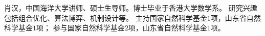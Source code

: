 %
%

\par{
肖汉，中国海洋大学讲师、硕士生导师。博士毕业于香港大学数学系。
研究兴趣包括组合优化、算法博弈、机制设计等。
主持国家自然科学基金$1$项，山东省自然科学基金$1$项；
参与国家自然科学基金$2$项，山东省自然科学基金$1$项。
}